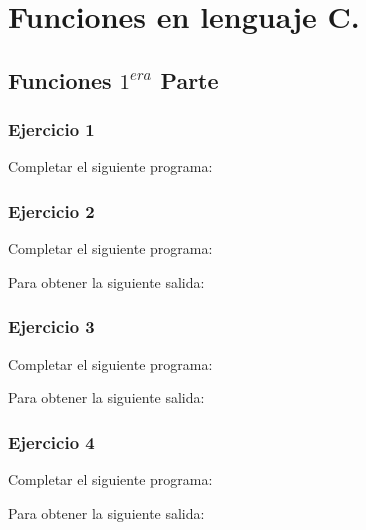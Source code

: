 \section{Funciones en lenguaje C.}
\setcounter{subsection}{7}

\subsection*{Funciones $1^{era}$ Parte} 

\subsubsection{Ejercicio 1} 
Completar el siguiente programa:

\lstset{inputencoding=utf8/latin1}

{\small
  \lstset{inputencoding=utf8/latin1}
  
}

\subsubsection{Ejercicio 2} 
Completar el siguiente programa:
\lstset{inputencoding=utf8/latin1}

Para obtener la siguiente salida:
{\small
  \lstset{inputencoding=utf8/latin1}
  
}

\subsubsection{Ejercicio 3} 
Completar el siguiente programa:
\lstset{inputencoding=utf8/latin1}

Para obtener la siguiente salida:
{\small
  \lstset{inputencoding=utf8/latin1}
  
}

\subsubsection{Ejercicio 4} 
Completar el siguiente programa:
\lstset{inputencoding=utf8/latin1}

Para obtener la siguiente salida:
{\small
  \lstset{inputencoding=utf8/latin1}
  
}

